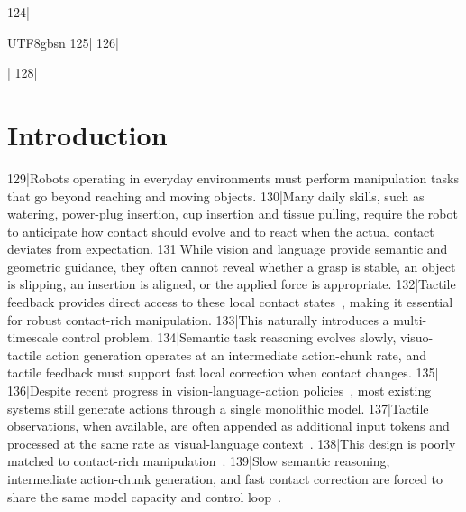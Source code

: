 124|\begin{CJK*}{UTF8}{gbsn}
125|
126||
128|\section{Introduction}
129|Robots operating in everyday environments must perform manipulation tasks that go beyond reaching and moving objects.
130|Many daily skills, such as watering, power-plug insertion, cup insertion and tissue pulling, require the robot to anticipate how contact should evolve and to react when the actual contact deviates from expectation.
131|While vision and language provide semantic and geometric guidance, they often cannot reveal whether a grasp is stable, an object is slipping, an insertion is aligned, or the applied force is appropriate.
132|Tactile feedback provides direct access to these local contact states~\cite{zhao2025touchbeginsvisionends,huang2026spatiallyanchoredtactileawareness,zhang2025tavlaelucidatingdesignspace,yuan2026vtamvideotactileactionmodelscomplex,huang2025tactilevlaunlockingvisionlanguageactionmodels,zheng2026omnivtavisuotactileworldmodeling}, making it essential for robust contact-rich manipulation.
133|This naturally introduces a multi-timescale control problem.
134|Semantic task reasoning evolves slowly, visuo-tactile action generation operates at an intermediate action-chunk rate, and tactile feedback must support fast local correction when contact changes.
135|
136|Despite recent progress in vision-language-action policies~\cite{black2026pi0visionlanguageactionflowmodel,intelligence2025pi05visionlanguageactionmodelopenworld,nvidia2025gr00tn1openfoundation,zheng2026egoscalescalingdexterousmanipulation,liu2025rdt1bdiffusionfoundationmodel,wang2026qwenvlaunifyingvisionlanguageactionmodeling,intelligence2026pi07steerablegeneralistrobotic,kim2024openvla,kim2025finetuningvisionlanguageactionmodelsoptimizing,dai2026conlacontrastivelatentaction,intelligence2025pi06vlalearnsexperience}, most existing systems still generate actions through a single monolithic model.
137|Tactile observations, when available, are often appended as additional input tokens and processed at the same rate as visual-language context~\cite{yuan2026ftp1generalistfoundationtactile}.
138|This design is poorly matched to contact-rich manipulation~\cite{xue2025reactivediffusionpolicyslowfast,xue2026tube}.
139|Slow semantic reasoning, intermediate action-chunk generation, and fast contact correction are forced to share the same model capacity and control loop~\cite{zhao2023learningfinegrainedbimanualmanipulation,chi2025diffusion}.

\end{CJK*}

